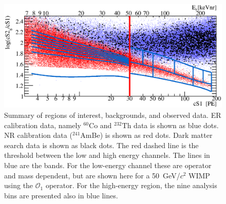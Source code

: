 \begin{figure}[]
\begin{minipage}{1\linewidth}
\centerline{\includegraphics[width=1\linewidth]{Figures/eft_sr.eps}}
\end{minipage}
\caption{Summary of regions of interest, backgrounds, and observed data. ER calibration data, namely $^{60}\mathrm{Co}$ and $^{232}\mathrm{Th}$ data is shown as blue dots. NR calibration data ($^{241}$AmBe) is shown as red dots. Dark matter search data is shown as black dots. The red dashed line is the threshold between the low and high energy channels. The lines in blue are the bands. For the low-energy channel these are operator and mass dependent, but are shown here for a 50~GeV/$c^2$ WIMP using the $\mathcal{O}_1$ operator. For the high-energy region, the nine analysis bins are presented also in blue lines.
}
\label{fig:phasespace}
\end{figure}  



